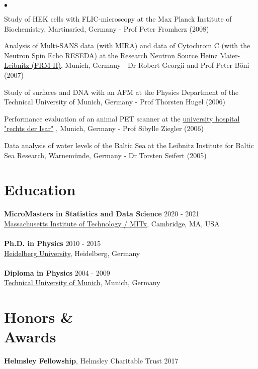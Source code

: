 \documentclass[margin,line]{res}
\newenvironment{list2}{
  \begin{list}{$\bullet$}{%
      \setlength{\itemsep}{0in}
      \setlength{\parsep}{0in} \setlength{\parskip}{0in}
      \setlength{\topsep}{0in} \setlength{\partopsep}{0in} 
      \setlength{\leftmargin}{0.2in}}}{\end{list}}
\begin{document}
\begin{resume}
\begin{list2}
\item Study of HEK cells with FLIC-microscopy at the Max Planck Institute of Biochemistry, Martinsried, Germany - Prof Peter Fromherz (2008)
\item Analysis of Multi-SANS data (with MIRA) and data of Cytochrom C (with the Neutron Spin Echo RESEDA) at the  \href{https://www.frm2.tum.de/en/home/}{Research Neutron Source Heinz Maier-Leibnitz (FRM II)}, Munich, Germany - Dr Robert Georgii and Prof Peter Böni (2007)
\item Study of surfaces and DNA with an AFM at the Physics Department of the Technical University of Munich, Germany - Prof Thorsten Hugel (2006)
\item Performance evaluation of an animal PET scanner at the  \href{https://www.mri.tum.de/}{university hospital "rechts der Isar"} , Munich, Germany - Prof Sibylle Ziegler (2006)
\item Data analysis of water levels of the Baltic Sea at the Leibnitz Institute for Baltic Sea Research, Warnemünde, Germany - Dr Torsten Seifert (2005)
\end{list2}


\section{\sc Education}
{\bf MicroMasters in Statistics and Data Science} \hfill {2020 - 2021}\\
\href{https://micromasters.mit.edu/ds/}{Massachusetts Institute of Technology / MITx}, Cambridge, MA, USA\\
\vspace*{-3mm}\\
{\bf Ph.D. in Physics} \hfill {2010 - 2015}\\
\href{https://www.uni-heidelberg.de/en}{Heidelberg University}, Heidelberg, Germany\\
\vspace*{-3mm}\\
{\bf Diploma in Physics} \hfill {2004 - 2009}\\
\href{https://www.tum.de/en/}{Technical University of Munich}, Munich, Germany


\section{\sc Honors \& \\Awards} 
{\bf Helmsley Fellowship}, Helmsley Charitable Trust  \hfill 2017


\end{resume}
\end{document}
